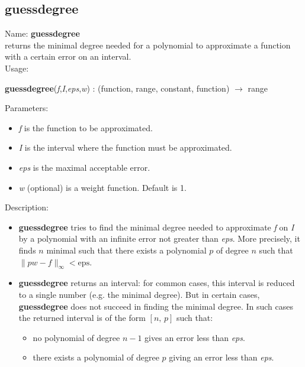 \subsection{guessdegree}
\label{labguessdegree}
\noindent Name: \textbf{guessdegree}\\
returns the minimal degree needed for a polynomial to approximate a function with a certain error on an interval.\\

\noindent Usage: 
\begin{center}
\textbf{guessdegree}(\emph{f},\emph{I},\emph{eps},\emph{w}) : (\textsf{function}, \textsf{range}, \textsf{constant}, \textsf{function}) $\rightarrow$ \textsf{range}\\
\end{center}
Parameters: 
\begin{itemize}
\item \emph{f} is the function to be approximated.
\item \emph{I} is the interval where the function must be approximated.
\item \emph{eps} is the maximal acceptable error.
\item \emph{w} (optional) is a weight function. Default is 1.
\end{itemize}
\noindent Description: \begin{itemize}

\item \textbf{guessdegree} tries to find the minimal degree needed to approximate \emph{f}
   on \emph{I} by a polynomial with an infinite error not greater than \emph{eps}.
   More precisely, it finds $n$ minimal such that there exists a
   polynomial $p$ of degree $n$ such that $\|pw-f\|_{\infty} < \mathrm{eps}$.

\item \textbf{guessdegree} returns an interval: for common cases, this interval is reduced to a 
   single number (e.g. the minimal degree). But in certain cases, \textbf{guessdegree} does
   not succeed in finding the minimal degree. In such cases the returned interval
   is of the form $[n,\,p]$ such that:
   \begin{itemize}
   \item no polynomial of degree $n-1$ gives an error less than \emph{eps}.
   \item there exists a polynomial of degree $p$ giving an error less than \emph{eps}. 
   \end{itemize}
\end{itemize}

